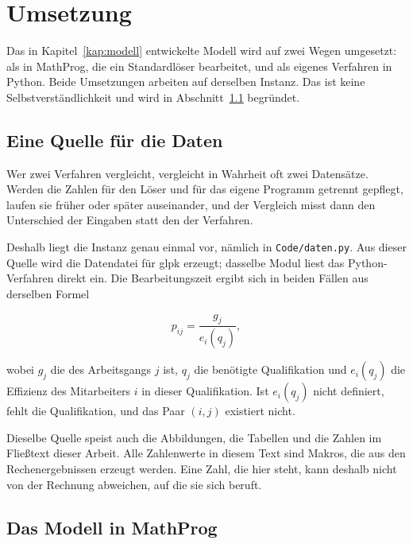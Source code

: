 \chapter{Umsetzung}
\label{kap:umsetzung}

Das in Kapitel~\ref{kap:modell} entwickelte Modell wird auf zwei Wegen
umgesetzt: als  in MathProg, die ein
Standardlöser bearbeitet, und als eigenes Verfahren in Python. Beide
Umsetzungen arbeiten auf derselben Instanz. Das ist keine
Selbstverständlichkeit und wird in Abschnitt~\ref{sec:einequelle}
begründet.

\section{Eine Quelle für die Daten}
\label{sec:einequelle}

Wer zwei Verfahren vergleicht, vergleicht in Wahrheit oft zwei
Datensätze. Werden die Zahlen für den Löser und für das eigene Programm
getrennt gepflegt, laufen sie früher oder später auseinander, und der
Vergleich misst dann den Unterschied der Eingaben statt den der
Verfahren.

Deshalb liegt die Instanz genau einmal vor, nämlich in
\texttt{Code/daten.py}. Aus dieser Quelle wird die Datendatei für
\ac{glpk} erzeugt; dasselbe Modul liest das Python-Verfahren direkt ein.
Die Bearbeitungszeit ergibt sich in beiden Fällen aus derselben Formel

\begin{equation}
  p_{ij} = \frac{g_j}{e_i(q_j)},
  \label{eq:dauer}
\end{equation}

wobei $g_j$ die  des Arbeitsgangs $j$ ist, $q_j$ die
benötigte Qualifikation und $e_i(q_j)$ die Effizienz des Mitarbeiters
$i$ in dieser Qualifikation. Ist $e_i(q_j)$ nicht definiert, fehlt die
Qualifikation, und das Paar $(i,j)$ existiert nicht.

Dieselbe Quelle speist auch die Abbildungen, die Tabellen und die
Zahlen im Fließtext dieser Arbeit. Alle Zahlenwerte in diesem Text sind
Makros, die aus den Rechenergebnissen erzeugt werden. Eine Zahl, die
hier steht, kann deshalb nicht von der Rechnung abweichen, auf die sie
sich beruft.

\section{Das Modell in MathProg}
\label{sec:mathprog}

